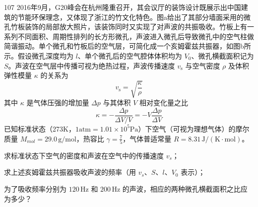 \begin{problem}[2019年第36届全国中学生物理竞赛复赛][微孔竹板声学共振吸收]{107}
2016年9月，G20峰会在杭州隆重召开，其会议厅的装饰设计既展示出中国建筑的节能环保理念，又体现了浙江的竹文化特色。图a给出了其部分墙面采用的微孔竹板装饰的局部放大照片，该装饰同时又实现了对声波的共振吸收。竹板上有一系列不同面积、周期性排列的长方形微孔，声波进入微孔后导致微孔中的空气柱做简谐振动。单个微孔和竹板后的空气层，可简化成一个亥姆霍兹共振器，如图b所示。假设微孔深度均为 $l$、单个微孔后的空气腔体体积均为 $V_{0}$、微孔横截面积记为 $S$。声波在空气层中传播可视为绝热过程，声波传播速度 $v_{\mathrm{s}}$ 与空气密度 $\rho$ 及体积弹性模量 $\kappa$ 的关系为
\[
v_{\mathrm{s}} = \sqrt{\frac{\kappa}{\rho}}
\]
其中 $\kappa$ 是气体压强的增加量 $\Delta p$ 与其体积 $V$ 相对变化量之比
\[
\kappa = - \frac{\Delta p}{\Delta V / V} = - V \frac{\Delta p}{\Delta V}
\]
已知标准状态（273K，$1\mathrm{atm}=1.01\times10^{5}\mathrm{Pa}$）下空气（可视为理想气体）的摩尔质量 $M_{mol}=29.0\,\mathrm{g/mol}$，热容比 $\gamma=\frac{7}{5}$，气体普适常量 $R=8.31\,\mathrm{J/(K\cdot mol)}$。
\begin{subproblem}
求标准状态下空气的密度和声波在空气中的传播速度 $v_{s}$；
\end{subproblem}
\begin{subproblem}
求上述亥姆霍兹共振器吸收声波的频率（用 $v_{s}$、$S$、$l$、$V_{0}$ 表示）；
\end{subproblem}
\begin{subproblem}
为了吸收频率分别为 $120\,\mathrm{Hz}$ 和 $200\,\mathrm{Hz}$ 的声波，相应的两种微孔横截面积之比应为多少？
\end{subproblem}
\end{problem}